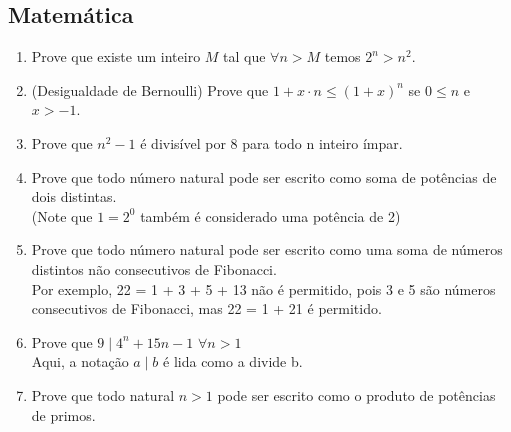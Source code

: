     \subsection{Matemática}
    \begin{enumerate}
    \item Prove que existe um inteiro $M$ tal que $\forall n>M$ temos $2^n>n^2$.
    
    \item (Desigualdade de Bernoulli) Prove que $1+x \cdot n \leq (1+x)^n$ se $0 \leq n$ e $x>-1$.
    
    \item Prove que $n^2-1$ é divisível por 8 para todo n inteiro ímpar.
    
    \item Prove que todo número natural pode ser escrito como soma de potências de dois distintas. \\ (Note que $1=2^0$ também é considerado uma potência de 2)
    
    \item Prove que todo número natural pode ser escrito como uma soma de números distintos não consecutivos de Fibonacci. \\ Por exemplo, 22 = 1 + 3 + 5 + 13 não é permitido, pois 3 e 5 são números consecutivos de Fibonacci, mas 22 = 1 + 21 é permitido.
    
    \item Prove que $9 \mid 4^n +15n-1 $ $\forall n>1$ \\ Aqui, a notação $a \mid b$ é lida como a divide b.
    
    \item Prove que todo natural $n>1$ pode ser escrito como o produto de potências de primos.
\end{enumerate}
